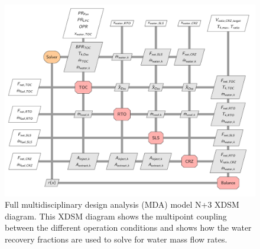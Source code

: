 \documentclass[conf]{new-aiaa}
\begin{document}
\begin{figure}[hbt!]
  \centering
  \includegraphics[width=\textwidth]{N3_xdsm_full.pdf}
  \caption{
    Full multidisciplinary design analysis (MDA) model N+3 XDSM diagram.
    This XDSM diagram shows the multipoint coupling between the different operation conditions and shows how the water recovery fractions are used to solve for water mass flow rates.
  }
  \label{fig:N3_xdsm_full}
\end{figure}
\end{document}

